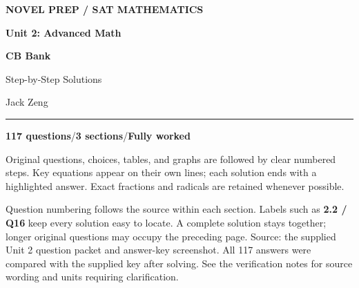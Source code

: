 \documentclass[11pt]{article}
\begin{document}
\vspace*{14pt}
{\small\bfseries\color{NPurple} NOVEL PREP / SAT MATHEMATICS}\par
\vspace{14pt}
{\Huge\bfseries\color{NPdeep} Unit 2: Advanced Math}\par
\vspace{6pt}
{\LARGE\bfseries\color{NPurple} CB Bank}\par
{\Large Step-by-Step Solutions}\par
\vspace{12pt}
{\large Jack Zeng}\par
\textcolor{NPurple}{\rule{\linewidth}{1.2pt}}\par
\vspace{8pt}
\colorbox{NPlav}{\parbox{\dimexpr\linewidth-2\fboxsep}{\vspace{8pt}\centering\large\textbf{117 questions}\quad /\quad\textbf{3 sections}\quad /\quad\textbf{Fully worked}\vspace{8pt}}}\par
\vspace{12pt}
Original questions, choices, tables, and graphs are followed by clear numbered steps. Key equations appear on their own lines; each solution ends with a highlighted answer. Exact fractions and radicals are retained whenever possible.

Question numbering follows the source within each section. Labels such as \textbf{2.2 / Q16} keep every solution easy to locate. A complete solution stays together; longer original questions may occupy the preceding page.
\vspace{8pt}
\tableofcontents
\vfill
{\small\color{NPgray}Source: the supplied Unit 2 question packet and answer-key screenshot. All 117 answers were compared with the supplied key after solving. See the verification notes for source wording and units requiring clarification.}
\clearpage
\end{document}
